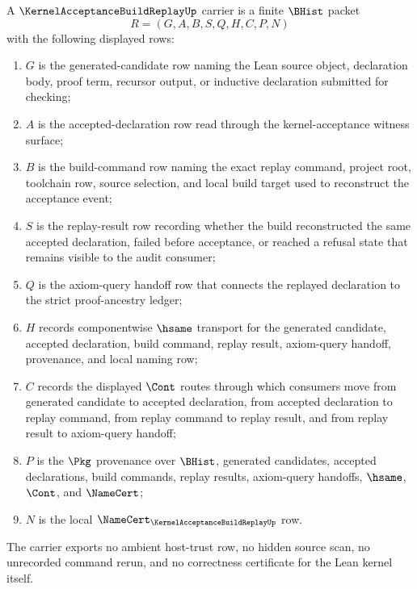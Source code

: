 \begin{definition}
\label{def:kernel-acceptance-build-replay-carrier}
A $\KernelAcceptanceBuildReplayUp$ carrier is a finite $\BHist$ packet
$$
R=(G,A,B,S,Q,H,C,P,N)
$$
with the following displayed rows:
\begin{enumerate}
\item $G$ is the generated-candidate row naming the Lean source object, declaration body, proof term, recursor output, or inductive declaration submitted for checking;
\item $A$ is the accepted-declaration row read through the kernel-acceptance witness surface;
\item $B$ is the build-command row naming the exact replay command, project root, toolchain row, source selection, and local build target used to reconstruct the acceptance event;
\item $S$ is the replay-result row recording whether the build reconstructed the same accepted declaration, failed before acceptance, or reached a refusal state that remains visible to the audit consumer;
\item $Q$ is the axiom-query handoff row that connects the replayed declaration to the strict proof-ancestry ledger;
\item $H$ records componentwise $\hsame$ transport for the generated candidate, accepted declaration, build command, replay result, axiom-query handoff, provenance, and local naming row;
\item $C$ records the displayed $\Cont$ routes through which consumers move from generated candidate to accepted declaration, from accepted declaration to replay command, from replay command to replay result, and from replay result to axiom-query handoff;
\item $P$ is the $\Pkg$ provenance over $\BHist$, generated candidates, accepted declarations, build commands, replay results, axiom-query handoffs, $\hsame$, $\Cont$, and $\NameCert$;
\item $N$ is the local $\NameCert_{\KernelAcceptanceBuildReplayUp}$ row.
\end{enumerate}
The carrier exports no ambient host-trust row, no hidden source scan, no unrecorded command rerun, and no correctness certificate for the Lean kernel itself.
\end{definition}

